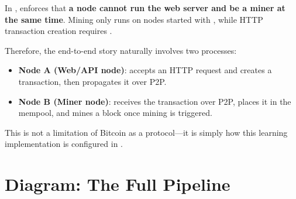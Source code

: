 In ,  enforces that \textbf{a node cannot run the web server and be a miner at the same time}. Mining only runs on nodes started with , while HTTP transaction creation requires .

Therefore, the end-to-end story naturally involves two processes:

\begin{itemize}
  \item \textbf{Node A (Web/API node)}: accepts an HTTP request and creates a transaction, then propagates it over P2P.
  \item \textbf{Node B (Miner node)}: receives the transaction over P2P, places it in the mempool, and mines a block once mining is triggered.
\end{itemize}

This is not a limitation of Bitcoin as a protocol---it is simply how this learning implementation is configured in .

\section{Diagram: The Full Pipeline}
\label{sec:ch09-9-pipeline}

